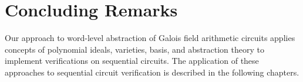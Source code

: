 \section{Concluding Remarks}
Our approach to word-level abstraction of Galois field arithmetic 
circuits applies concepts of polynomial ideals, varieties, \Grobner basis, 
and abstraction theory to implement verifications on sequential circuits. 
The application of these approaches to sequential circuit verification is described in the following chapters. 